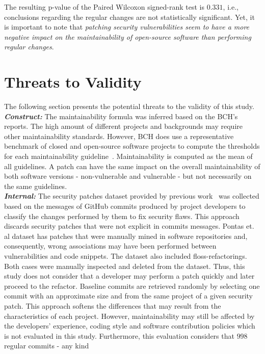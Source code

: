 \documentclass[10pt,conference]{IEEEtran}
\begin{document}
The resulting p-value of the Paired Wilcoxon signed-rank test is $0.331$, i.e., 
conclusions regarding the regular changes are not statistically significant. 
Yet, it is important to note that \emph{patching security vulnerabilities seem 
to have a more negative impact on the maintainability of open-source software 
than performing regular changes}.

\section{Threats to Validity}\label{sec:threats}
%
The following section presents the potential threats to the validity of this
study.
%
\\\textit{\textbf{Construct:}} The maintainability formula was inferred based 
on the BCH's reports. The high amount of different projects and backgrounds 
may require other maintainability standards. However, BCH does use a 
representative benchmark of closed and open-source software projects to compute 
the thresholds for each maintainability guideline~\cite{Visser:2016:OREILLY, Baggen2012}.
Maintainability is computed as the mean of all guidelines. A patch can
have the same impact on the overall maintainability of both software versions 
- non-vulnerable and vulnerable - but not necessarily on the same 
guidelines.
%
\\\textit{\textbf{Internal:}} The security patches dataset provided by previous
work~\cite{Reis:2017:IJSSE} was collected based on the messages of GitHub
commits produced by project developers to classify the changes performed by them
to fix security flaws. This approach discards security patches that were
not explicit in commits messages. Pontas et. al\cite{10.1109/MSR.2019.00064} dataset
has patches that were manually mined in software repositories and, consequently,
wrong associations may have been performed between vulnerabilities and code snippets. 
The dataset also included floss-refactorings. Both cases were manually inspected
and deleted from the dataset. Thus, this study does not consider that a
developer may perform a patch quickly and later proceed to the refactor.
Baseline commits are retrieved randomly by selecting one commit with an 
approximate size and from the same project of a given security patch. 
This approach softens the differences
that may result from the characteristics of each project. However,
maintainability may still be affected by the developers' experience, coding
style and software contribution policies which is not evaluated in this study.
Furthermore, this evaluation considers that $998$ regular commits - any kind
\end{document}

